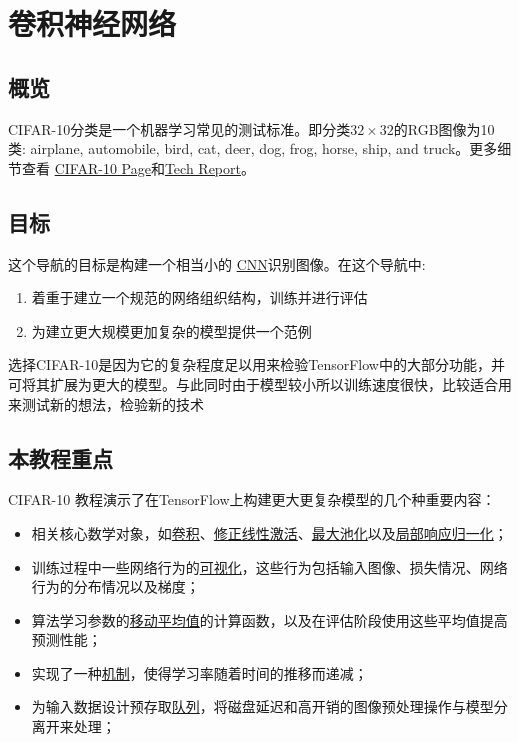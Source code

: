 \section{卷积神经网络}
\subsection{概览}
CIFAR-10分类是一个机器学习常见的测试标准。即分类$32\times32$的RGB图像为10类:
airplane, automobile, bird, cat, deer, dog, frog, horse, ship, and truck。更多细节查看
\href{https://www.cs.toronto.edu/~kriz/cifar.html}{CIFAR-10 Page}和\href{https://www.cs.toronto.edu/~kriz/learning-features-2009-TR.pdf}{Tech Report}。
\subsection{目标}
这个导航的目标是构建一个相当小的
\href{https://en.wikipedia.org/wiki/Convolutional_neural_network}{CNN}识别图像。在这个导航中:
\begin{enumerate}
\item 着重于建立一个规范的网络组织结构，训练并进行评估
\item 为建立更大规模更加复杂的模型提供一个范例
\end{enumerate}

选择CIFAR-10是因为它的复杂程度足以用来检验TensorFlow中的大部分功能，并可将其扩展为更大的模型。与此同时由于模型较小所以训练速度很快，比较适合用来测试新的想法，检验新的技术
\subsection{本教程重点}
CIFAR-10 教程演示了在TensorFlow上构建更大更复杂模型的几个种重要内容：
\begin{itemize}
\item 相关核心数学对象，如\href{https://www.tensorflow.org/api_docs/python/tf/nn/conv2d}{卷积}、\href{https://www.tensorflow.org/api_docs/python/tf/nn/relu}{修正线性激活}、\href{https://www.tensorflow.org/api_docs/python/tf/nn/max_pool}{最大池化}以及\href{https://www.tensorflow.org/api_docs/python/tf/nn/local_response_normalization}{局部响应归一化}；
\item 训练过程中一些网络行为的\href{https://www.tensorflow.org/get_started/summaries_and_tensorboard}{可视化}，这些行为包括输入图像、损失情况、网络行为的分布情况以及梯度；
\item 算法学习参数的\href{https://www.tensorflow.org/api_docs/python/tf/train/ExponentialMovingAverage}{移动平均值}的计算函数，以及在评估阶段使用这些平均值提高预测性能；
\item 实现了一种\href{https://www.tensorflow.org/api_docs/python/tf/train/exponential_decay}{机制}，使得学习率随着时间的推移而递减；
\item 为输入数据设计预存取\href{https://www.tensorflow.org/api_docs/python/tf/train/shuffle_batch}{队列}，将磁盘延迟和高开销的图像预处理操作与模型分离开来处理；
\end{itemize}

